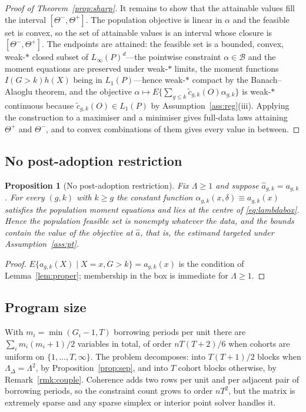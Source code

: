 \documentclass[12pt]{article}
\newtheorem{proposition}{Proposition}
\theoremstyle{remark}
\begin{document}
\begin{proof}[Proof of Theorem~\ref{prop:sharp}]
It remains to show that the attainable values fill the interval $[\Theta^-, \Theta^+]$.
The population objective is linear in $\alpha$ and the feasible set is convex, so the set
of attainable values is an interval whose closure is $[\Theta^-, \Theta^+]$. The endpoints
are attained: the feasible set is a bounded, convex, weak-$*$ closed subset of
$L_\infty(P)^{d}$---the pointwise constraint $\alpha \in \mathcal{B}$ and the moment
equations are preserved under weak-$*$ limits, the moment functions $I(G{>}k)h(X)$ being
in $L_1(P)$---hence weak-$*$ compact by the Banach--Alaoglu theorem, and the objective
$\alpha \mapsto E\{\sum_{g \le k}\tilde c_{g,k}(O)\alpha_{g,k}\}$ is weak-$*$ continuous
because $\tilde c_{g,k}(O) \in L_1(P)$ by Assumption~\ref{ass:reg}(iii). Applying the
construction to a maximiser and a minimiser gives full-data laws attaining $\Theta^+$ and
$\Theta^-$, and to convex combinations of them gives every value in between.
\end{proof}

\subsection{No post-adoption restriction}

\begin{proposition}[No post-adoption restriction]
\label{prop:notest}
Fix $\Lambda \ge 1$ and suppose $\widehat a_{g,k} = a_{g,k}$. For every $(g,k)$ with
$k \ge g$ the constant function $\alpha_{g,k}(x,\delta) \equiv a_{g,k}(x)$ satisfies the
population moment equations and lies at the centre of \eqref{eq:lambdabox}. Hence the
population feasible set is nonempty whatever the data, and the bounds contain the value of
the objective at $\widehat a$, that is, the estimand targeted under
Assumption~\ref{ass:pt}.
\end{proposition}

\begin{proof}
$E\{a_{g,k}(X)\mid X{=}x, G{>}k\} = a_{g,k}(x)$ is the condition of Lemma~\ref{lem:proper};
membership in the box is immediate for $\Lambda \ge 1$.
\end{proof}

\subsection{Program size}

With $m_i = \min(G_i{-}1, T)$ borrowing periods per unit there are
$\sum_i m_i(m_i{+}1)/2$ variables in total, of order $nT(T{+}2)/6$ when cohorts are
uniform on $\{1,\ldots,T,\infty\}$. The problem decomposes: into $T(T{+}1)/2$ blocks when
$\Lambda_\Delta = \Lambda^2$, by Proposition~\ref{prop:sep}, and into $T$ cohort blocks
otherwise, by Remark~\ref{rmk:couple}. Coherence adds two rows per unit and per adjacent
pair of borrowing periods, so the constraint count grows to order $nT^2$, but the matrix
is extremely sparse and any sparse simplex or interior point solver handles it.
\end{document}
